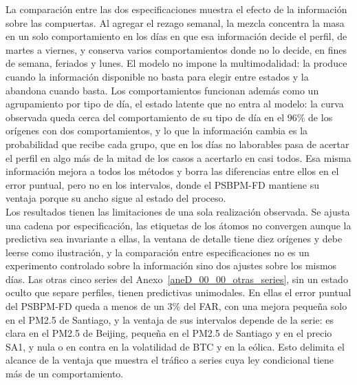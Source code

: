 La comparación entre las dos especificaciones muestra el efecto de la información sobre las compuertas. Al agregar el rezago semanal, la mezcla concentra la masa en un solo comportamiento en los días en que esa información decide el perfil, de martes a viernes, y conserva varios comportamientos donde no lo decide, en fines de semana, feriados y lunes. El modelo no impone la multimodalidad: la produce cuando la información disponible no basta para elegir entre estados y la abandona cuando basta. Los comportamientos funcionan además como un agrupamiento por tipo de día, el estado latente que no entra al modelo: la curva observada queda cerca del comportamiento de su tipo de día en el $96\%$ de los orígenes con dos comportamientos, y lo que la información cambia es la probabilidad que recibe cada grupo, que en los días no laborables pasa de acertar el perfil en algo más de la mitad de los casos a acertarlo en casi todos. Esa misma información mejora a todos los métodos y borra las diferencias entre ellos en el error puntual, pero no en los intervalos, donde el PSBPM-FD mantiene su ventaja porque su ancho sigue al estado del proceso.\\

Los resultados tienen las limitaciones de una sola realización observada. Se ajusta una cadena por especificación, las etiquetas de los átomos no convergen aunque la predictiva sea invariante a ellas, la ventana de detalle tiene diez orígenes y debe leerse como ilustración, y la comparación entre especificaciones no es un experimento controlado sobre la información sino dos ajustes sobre los mismos días. Las otras cinco series del Anexo~\ref{aneD_00_00_otras_series}, sin un estado oculto que separe perfiles, tienen predictivas unimodales. En ellas el error puntual del PSBPM-FD queda a menos de un $3\%$ del FAR, con una mejora pequeña solo en el PM2.5 de Santiago, y la ventaja de sus intervalos depende de la serie: es clara en el PM2.5 de Beijing, pequeña en el PM2.5 de Santiago y en el precio SA1, y nula o en contra en la volatilidad de BTC y en la eólica. Esto delimita el alcance de la ventaja que muestra el tráfico a series cuya ley condicional tiene más de un comportamiento.
